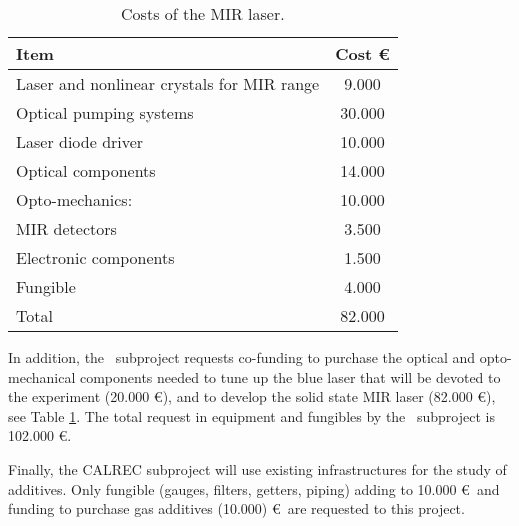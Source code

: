 \begin{table}[h!]
\begin{center}
\begin{tabular}{|l|c|}
\hline
 Item & Cost \euro  \\
 \hline
Laser and nonlinear crystals for MIR range &  9.000 \\
Optical pumping systems & 30.000 \\
Laser diode driver & 10.000  \\
Optical components &14.000 \\
Opto-mechanics: &10.000 \\
MIR detectors & 3.500 \\
Electronic components & 1.500\\
Fungible & 4.000 \\
  \hline
 Total &  82.000 \\
 \hline
\end{tabular}  
\caption{Costs of the MIR laser.}
\label{tab.MIR}
\end{center}
\end{table} 

In addition, the \BATA\ subproject requests co-funding to purchase the optical and opto-mechanical components needed to tune up the blue laser that will be devoted to the experiment (20.000 \euro), and to develop the solid state MIR laser (82.000 \euro), see Table \ref{tab.MIR}. The total request in equipment and fungibles by the \BATA\ subproject is 102.000 \euro.

Finally, the CALREC subproject will use existing infrastructures for the study of additives. Only fungible (gauges, filters, getters, piping) adding to 10.000 \euro\ and funding to purchase gas additives (10.000) \euro\ are requested to this project. 
